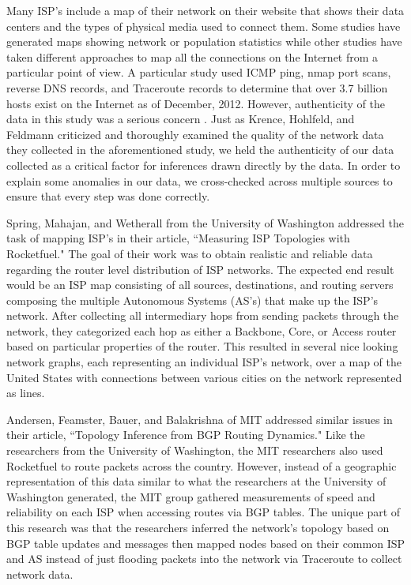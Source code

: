 \documentclass{sigcomm-alternate}
\begin{document}
Many ISP's include a map of their network on their website that shows their data centers and the types of physical media used to connect them. Some studies have generated maps showing network or population statistics while other studies have taken different approaches to map all the connections on the Internet from a particular point of view. A particular study used ICMP ping, nmap port scans, reverse DNS records, and Traceroute records to determine that over 3.7 billion hosts exist on the Internet as of December, 2012. However, authenticity of the data in this study was a serious concern \cite{botnet}. Just as Krence, Hohlfeld, and Feldmann criticized and thoroughly examined the quality of the network data they collected in the aforementioned study, we held the authenticity of our data collected as a critical factor for inferences drawn directly by the data. In order to explain some anomalies in our data, we cross-checked across multiple sources to ensure that every step was done correctly. 


Spring, Mahajan, and Wetherall \cite{topology} from the University of Washington addressed the task of mapping ISP's in their article, “Measuring ISP Topologies with Rocketfuel." The goal of their work was to obtain realistic and reliable data regarding the router level distribution of ISP networks. The expected end result would be an ISP map consisting of all sources, destinations, and routing servers composing the multiple Autonomous Systems (AS's) that make up the ISP's network. After collecting all intermediary hops from sending packets through the network, they categorized each hop as either a Backbone, Core, or Access router based on particular properties of the router. This resulted in several nice looking network graphs, each representing an individual ISP's network, over a map of the United States with connections between various cities on the network represented as lines.  				
					
Andersen, Feamster, Bauer, and Balakrishna \cite{inference} of MIT addressed similar issues in their article, “Topology Inference from BGP Routing Dynamics." Like the researchers from the University of Washington, the MIT researchers also used Rocketfuel to route packets across the country. However, instead of a geographic representation of this data similar to what the researchers at the University of Washington generated, the MIT group gathered measurements of speed and reliability on each ISP when accessing routes via BGP tables. The unique part of this research was that the researchers inferred the network's topology based on BGP table updates and messages then mapped nodes based on their common ISP and AS instead of just flooding packets into the network via Traceroute to collect network data. 
\end{document}
